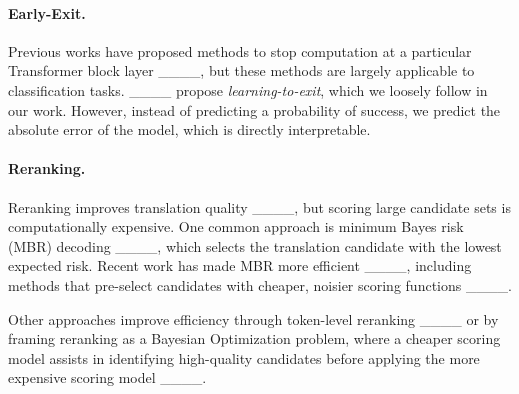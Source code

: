 \paragraph{Early-Exit.}
Previous works have proposed methods to stop computation at a particular Transformer block layer ____, but these methods are largely applicable to classification tasks.
____ propose \textit{learning-to-exit}, which we loosely follow in our work.
However, instead of predicting a probability of success, we predict the absolute error of the model, which is directly interpretable.

\paragraph{Reranking.}
Reranking improves translation quality ____, but scoring large candidate sets is computationally expensive. One common approach is minimum Bayes risk (MBR) decoding ____, which selects the translation candidate with the lowest expected risk. Recent work has made MBR more efficient ____, including methods that pre-select candidates with cheaper, noisier scoring functions ____.

Other approaches improve efficiency through token-level reranking ____ or by framing reranking as a Bayesian Optimization problem, where a cheaper scoring model assists in identifying high-quality candidates before applying the more expensive scoring model ____.